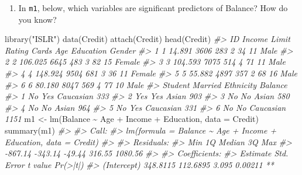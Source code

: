 \documentclass[
]{book}
\newenvironment{Shaded}{\begin{snugshade}}{\end{snugshade}}
\newcommand{\AttributeTok}[1]{\textcolor[rgb]{0.77,0.63,0.00}{#1}}
\newcommand{\CommentTok}[1]{\textcolor[rgb]{0.56,0.35,0.01}{\textit{#1}}}
\newcommand{\FunctionTok}[1]{\textcolor[rgb]{0.00,0.00,0.00}{#1}}
\newcommand{\NormalTok}[1]{#1}
\newcommand{\OtherTok}[1]{\textcolor[rgb]{0.56,0.35,0.01}{#1}}
\newcommand{\SpecialCharTok}[1]{\textcolor[rgb]{0.00,0.00,0.00}{#1}}
\newcommand{\StringTok}[1]{\textcolor[rgb]{0.31,0.60,0.02}{#1}}
\providecommand{\tightlist}{%
  \setlength{\itemsep}{0pt}\setlength{\parskip}{0pt}}
\begin{document}
\begin{enumerate}
\def\labelenumi{\arabic{enumi}.}
\setcounter{enumi}{1}
\tightlist
\item
  In \texttt{m1}, below, which variables are significant predictors of Balance? How do you know?
\end{enumerate}

\begin{Shaded}
\begin{Highlighting}[]
\FunctionTok{library}\NormalTok{(}\StringTok{"ISLR"}\NormalTok{)}
\FunctionTok{data}\NormalTok{(Credit)}
\FunctionTok{attach}\NormalTok{(Credit)}
\FunctionTok{head}\NormalTok{(Credit)}
\CommentTok{\#\textgreater{}   ID  Income Limit Rating Cards Age Education Gender}
\CommentTok{\#\textgreater{} 1  1  14.891  3606    283     2  34        11   Male}
\CommentTok{\#\textgreater{} 2  2 106.025  6645    483     3  82        15 Female}
\CommentTok{\#\textgreater{} 3  3 104.593  7075    514     4  71        11   Male}
\CommentTok{\#\textgreater{} 4  4 148.924  9504    681     3  36        11 Female}
\CommentTok{\#\textgreater{} 5  5  55.882  4897    357     2  68        16   Male}
\CommentTok{\#\textgreater{} 6  6  80.180  8047    569     4  77        10   Male}
\CommentTok{\#\textgreater{}   Student Married Ethnicity Balance}
\CommentTok{\#\textgreater{} 1      No     Yes Caucasian     333}
\CommentTok{\#\textgreater{} 2     Yes     Yes     Asian     903}
\CommentTok{\#\textgreater{} 3      No      No     Asian     580}
\CommentTok{\#\textgreater{} 4      No      No     Asian     964}
\CommentTok{\#\textgreater{} 5      No     Yes Caucasian     331}
\CommentTok{\#\textgreater{} 6      No      No Caucasian    1151}
\NormalTok{m1 }\OtherTok{\textless{}{-}} \FunctionTok{lm}\NormalTok{(Balance }\SpecialCharTok{\textasciitilde{}}\NormalTok{ Age }\SpecialCharTok{+}\NormalTok{ Income }\SpecialCharTok{+}\NormalTok{ Education, }\AttributeTok{data =}\NormalTok{ Credit)}
\FunctionTok{summary}\NormalTok{(m1)}
\CommentTok{\#\textgreater{} }
\CommentTok{\#\textgreater{} Call:}
\CommentTok{\#\textgreater{} lm(formula = Balance \textasciitilde{} Age + Income + Education, data = Credit)}
\CommentTok{\#\textgreater{} }
\CommentTok{\#\textgreater{} Residuals:}
\CommentTok{\#\textgreater{}     Min      1Q  Median      3Q     Max }
\CommentTok{\#\textgreater{} {-}867.14 {-}343.14  {-}49.44  316.55 1080.56 }
\CommentTok{\#\textgreater{} }
\CommentTok{\#\textgreater{} Coefficients:}
\CommentTok{\#\textgreater{}             Estimate Std. Error t value Pr(\textgreater{}|t|)    }
\CommentTok{\#\textgreater{} (Intercept) 348.8115   112.6895   3.095  0.00211 ** }

\end{Highlighting}
\end{Shaded}
\end{document}
